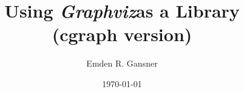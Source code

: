 \documentclass[11pt]{article}
\date{\today}
\def\gviz{{\it Graphviz}}
\begin{document}

\author{Emden R. Gansner}
\title{Using \gviz as a Library \\
(cgraph version)}
\maketitle

\newpage
\tableofcontents
\newpage







%
%

\clearpage


\appendix
\clearpage



\end{document}
